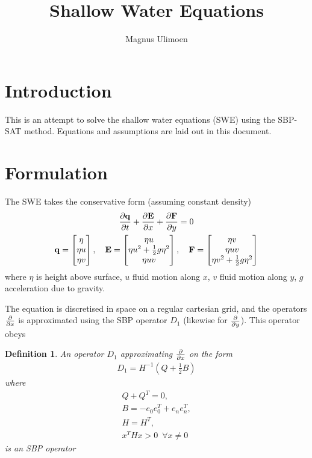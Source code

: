 \documentclass[british]{scrartcl}
\title{Shallow Water Equations}
\author{Magnus Ulimoen}
\newtheorem{definition}{Definition}
\newcommand{\ve}[1]{\mathbf{#1}}
\begin{document}
\maketitle

\section{Introduction}

This is an attempt to solve the shallow water equations (SWE) using the SBP-SAT method. Equations and assumptions are laid out in this document.


\section{Formulation}

The SWE takes the conservative form (assuming constant density)
\begin{gather}
    \label{eq:conservative_formulation}
    \pdv{\ve{q}}{t} + \pdv{\ve{E}}{x} + \pdv{\ve{F}}{y} = 0\\
    \ve{q} = \begin{bmatrix} \eta \\ \eta u \\ \eta v \end{bmatrix}, \hspace{1em}
        \ve{E} = \begin{bmatrix} \eta u \\ \eta u^2 + \frac{1}{2} g \eta^2 \\ \eta u v\end{bmatrix}, \hspace{1em}
        \ve{F} = \begin{bmatrix} \eta v \\ \eta u v \\ \eta v^2 + \frac{1}{2} g \eta^2 \end{bmatrix}
\end{gather}
where $\eta$ is height above surface, $u$ fluid motion along $x$, $v$ fluid motion along $y$, $g$ acceleration due to gravity.

The equation is discretised in space on a regular cartesian grid, and the operators $\pdv{x}$ is approximated using the SBP operator $D_1$ (likewise for $\pdv{y}$). This operator obeys
\begin{definition}
    An operator $D_1$ approximating $\pdv{x}$ on the form
    \begin{gather*}
        D_1 = H^{-1} \left( Q + \frac{1}{2} B \right)
    \end{gather*}
    where
    \begin{gather*}
        Q + Q^T = 0, \\
        B = -e_0 e_0^T + e_n e_n^T, \\
        H = H^T, \\
        x^T H x > 0\,\,\, \forall x \neq 0
    \end{gather*}
    is an SBP operator
\end{definition}
\end{document}
